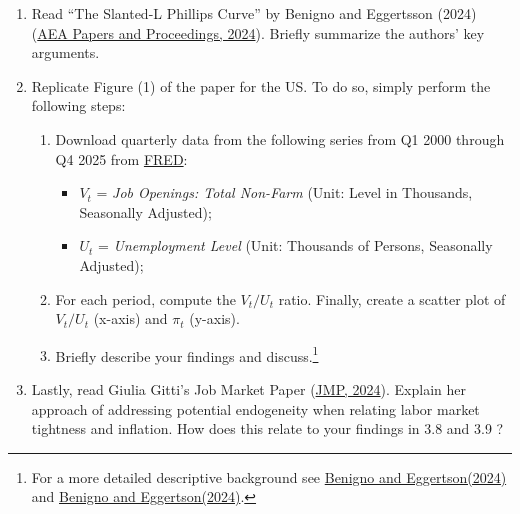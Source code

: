\documentclass[dvipsnames,11pt]{article}
\begin{document}
        \begin{enumerate}[resume]
            \item Read “The Slanted-L Phillips Curve” by Benigno and Eggertsson (2024) (\href{https://doi.org/10.1257/pandp.20241051}{AEA Papers and Proceedings, 2024}). Briefly summarize the authors’ key arguments.
        
            \item Replicate Figure (1) of the paper for the US. To do so, simply perform the following steps: 
    
            \begin{enumerate}
                \item Download quarterly data from the following series from Q1 2000 through Q4 2025 from \href{https://fred.stlouisfed.org}{FRED}:
                \begin{itemize}
                    \item $V_t$ = \textit{Job Openings: Total Non-Farm} (Unit: Level in Thousands, Seasonally Adjusted);
                    \item $U_t$ = \textit{Unemployment Level} (Unit: Thousands of Persons, Seasonally Adjusted);
                \end{itemize}
                
                \item For each period, compute the $V_t/U_t$ ratio. Finally, create a scatter plot of \(V_t/U_t\) (x-axis) and \(\pi_{t}\) (y-axis). 
        
                \item Briefly describe your findings and discuss.\footnote{For a more detailed descriptive background see \href{https://www.nber.org/papers/w31197}{Benigno and Eggertson(2024)} and \href{https://www.nber.org/papers/w33095}{Benigno and Eggertson(2024)}.} 
            \end{enumerate}

            \item Lastly, read Giulia Gitti's Job Market Paper (\href{https://drive.google.com/file/d/1ZD9WUJ06xZFO8bhZsQyy3tZZfk2yC8oH/view}{JMP, 2024}). Explain her approach of addressing potential endogeneity when relating labor market tightness and inflation. How does this relate to your findings in 3.8 and 3.9 ?
        \end{enumerate}


    

\printbibliography
\end{document}
